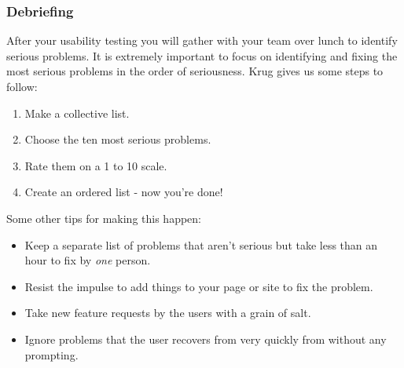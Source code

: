 \documentclass{article}%
\begin{document}
    \subsubsection{Debriefing}
    After your usability testing you will gather with your team over lunch to identify
    serious problems. It is extremely important to focus on identifying and fixing
    the most serious problems in the order of seriousness. \newline Krug gives us some steps
    to follow:
    \begin{enumerate}
      \item Make a collective list.
      \item Choose the ten most serious problems.
      \item Rate them on a 1 to 10 scale.
      \item Create an ordered list - now you're done!
    \end{enumerate}
    Some other tips for making this happen:
    \begin{itemize}
      \item Keep a separate list of problems that aren't serious but take less than an hour to fix by \emph{one} person.
      \item Resist the impulse to add things to your page or site to fix the problem.
      \item Take new feature requests by the users with a grain of salt.
      \item Ignore problems that the user recovers from very quickly from without any prompting.
    \end{itemize}
\end{document}
